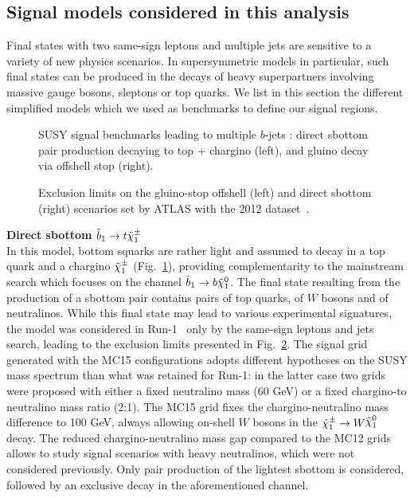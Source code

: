 \subsection{Signal models considered in this analysis}
\label{subsec:signal_models}
Final states with two same-sign leptons and multiple jets are sensitive to a variety of new physics scenarios. 
In supersymmetric models in particular, such final states can be produced in the decays of heavy superpartners 
involving massive gauge bosons, sleptons or top quarks. 
We list in this section the different simplified models which we used as benchmarks to define our signal regions. 

\begin{figure}[htb!]
\centering
{}
\hspace{3cm}
\caption{SUSY signal benchmarks leading to multiple $b$-jets : 
direct sbottom pair production decaying to top $+$ chargino (left), and gluino decay via offshell stop (right).}
\label{fig:feynman_3rdgen}
\end{figure}

\begin{figure}[t]
\centering
{}
\caption{Exclusion limits on the gluino-stop offshell (left) and direct sbottom (right) scenarios 
set by ATLAS with the 2012 dataset~\cite{DraftSquarkGluinoSummaryPaper}.}
\label{fig:run1excl_3rdgen}
\end{figure}


\par{\bf Direct sbottom $\tilde{b}_{1}\to t\tilde{\chi}_{1}^{\pm}$\\}
In this model, bottom squarks are rather light and assumed to decay in a top quark and a chargino $\tilde{\chi}_{1}^{\pm}$ (Fig.~\ref{fig:feynman_3rdgen}), 
providing complementarity to the mainstream search which focuses on the channel $\tilde{b}_{1}\to b\tilde{\chi}_{1}^{0}$. 
The final state resulting from the production of a sbottom pair contains pairs of top quarks, of $W$ bosons and of neutralinos. 
While this final state may lead to various experimental signatures, 
the model was considered in Run-1~\cite{DraftSquarkGluinoSummaryPaper} 
only by the same-sign leptons and jets search, leading to the exclusion limits presented in Fig.~\ref{fig:run1excl_3rdgen}. 
The signal grid generated with the MC15 configurations adopts different hypotheses on the SUSY mass spectrum than what was retained for Run-1: 
in the latter case two grids were proposed with either a fixed neutralino mass (60 GeV) or a fixed chargino-to neutralino mass ratio (2:1). 
The MC15 grid fixes the chargino-neutralino mass difference to 100 GeV, always allowing on-shell $W$ bosons in the $\chargino\to W\ninoone$ decay. 
The reduced chargino-neutralino mass gap compared to the MC12 grids allows to study signal scenarios with heavy neutralinos, which were not considered previously. 
Only pair production of the lightest sbottom is considered, followed by an exclusive decay in the aforementioned channel. \\

